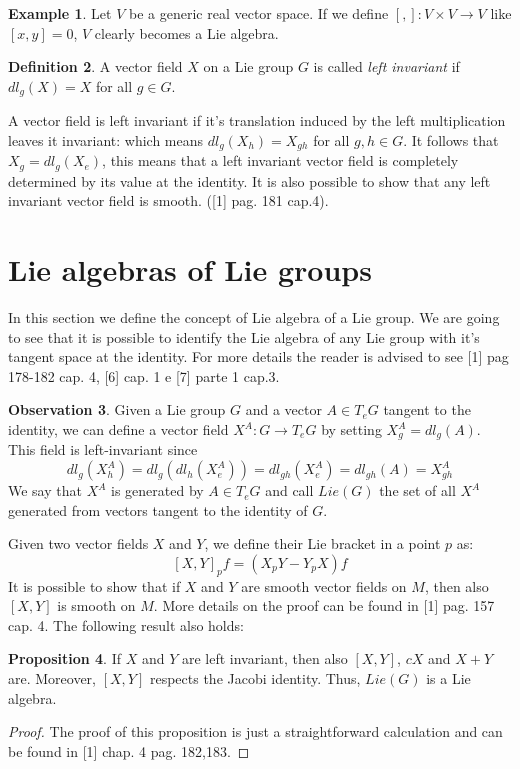 \documentclass[12pt,a4paper]{report}
\theoremstyle{definition}
\newtheorem{Def}{Definition}[chapter]
\theoremstyle{Theorem}
\newtheorem{Prop}[Def]{Proposition}
\theoremstyle{definition}
\newtheorem{Ex}[Def]{Example}
\theoremstyle{definition}
\newtheorem{Obs}[Def]{Observation}
\begin{document}
		\begin{Ex}
			Let $V$ be a generic real vector space. If we define $[,]:V\times V\rightarrow V$ like $[x,y]=0$, $V$ clearly becomes a Lie algebra.
		\end{Ex}
		\begin{Def}
			A vector field $X$ on a Lie group $G$ is called \textit{left invariant} if $dl_g(X)=X$ for all $g\in G$.
		\end{Def}
		A vector field is left invariant if it's translation induced by the left multiplication leaves it invariant: which means $dl_g(X_h)=X_{gh}$ for all $g,h\in G$.
		It follows that $X_g=dl_g(X_e)$, this means that a left invariant vector field is completely determined by its value at the identity. It is also possible to show that any left invariant vector field is smooth. ([1] pag. 181 cap.4).
		\section{Lie algebras of Lie groups}
		In this section we define the concept of Lie algebra of a Lie group. We are going to see that it is possible to identify the Lie algebra of any Lie group with it's tangent space at the identity. For more details the reader is advised to see [1] pag 178-182 cap. 4, [6] cap. 1 e [7] parte 1 cap.3.
		\begin{Obs} \label{Obs: 2.2}
			Given a Lie group $G$ and a vector $A\in T_eG$ tangent to the identity, we can define a vector field $X^A:G\rightarrow T_eG$ by setting $X^A_g=dl_g(A)$. This field is left-invariant since $$dl_g(X^A_h)=dl_g(dl_h(X^A_e))=dl_{gh}(X^A_e)=dl_{gh}(A)=X^A_{gh}$$
			We say that $X^A$ is generated by $A\in T_eG$ and call $Lie(G)$ the set of all $X^A$ generated from vectors tangent to the identity of $G$.	
		\end{Obs}
		Given two vector fields $X$ and $Y$, we define their Lie bracket in a point $p$ as:
		$$[X,Y]_pf=(X_pY-Y_pX)f$$
		It is possible to show that if $X$ and $Y$ are smooth vector fields on $M$, then also $[X,Y]$ is smooth on $M$. More details on the proof can be found in [1] pag. 157 cap. 4. The following result also holds:
		\begin{Prop}
			If $X$ and $Y$ are left invariant, then also $[X,Y]$, $cX$ and $X+Y$ are. Moreover, $[X,Y]$ respects the Jacobi identity. Thus, $Lie(G)$ is a Lie algebra.
		\end{Prop}
		\begin{proof}
			The proof of this proposition is just a straightforward calculation and can be found in [1] chap. 4 pag. 182,183.
		\end{proof}
\end{document}
